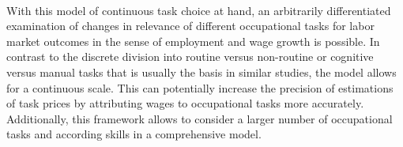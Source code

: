 \documentclass[../main.tex]{subfiles}
\begin{document}
\\
With this model of continuous task choice at hand, an arbitrarily differentiated examination of changes in relevance of different occupational tasks for labor market outcomes in the sense of employment and wage growth is possible. In contrast to the discrete division into routine versus non-routine or cognitive versus manual tasks that is usually the basis in similar studies, the model allows for a continuous scale. This can potentially increase the precision of estimations of task prices by attributing wages to occupational tasks more accurately. Additionally, this framework allows to consider a larger number of occupational tasks and according skills in a comprehensive model.

\end{document}
